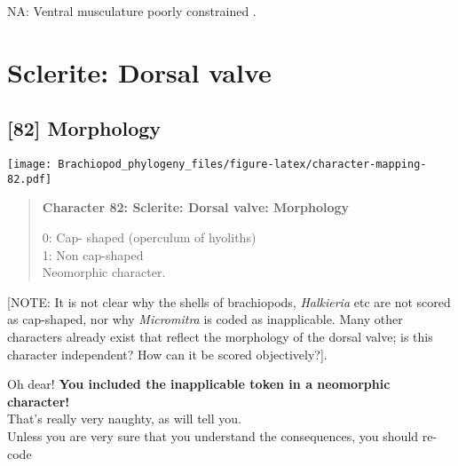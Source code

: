 \documentclass[openany]{book}
\theoremstyle{definition}
\theoremstyle{definition}
\theoremstyle{definition}
\theoremstyle{remark}
\begin{document}
\hypertarget{NA-coding-81}{}
NA: Ventral musculature poorly constrained
\citep{Williams2000LinguliformeaCraniiformea, Popov2009Earlyontogeny}.

\section{Sclerite: Dorsal valve}\label{sclerite-dorsal-valve}

\subsection*{{[}82{]} Morphology}\label{morphology-2}

\texttt{[image: Brachiopod\_phylogeny\_files/figure-latex/character-mapping-82.pdf]}

\begin{quote}
\textbf{Character 82: Sclerite: Dorsal valve: Morphology}

0: Cap- shaped (operculum of hyoliths)\\
1: Non cap-shaped\\
Neomorphic character.
\end{quote}

{[}NOTE: It is not clear why the shells of brachiopods, \emph{Halkieria}
etc are not scored as cap-shaped, nor why \emph{Micromitra} is coded as
inapplicable. Many other characters already exist that reflect the
morphology of the dorsal valve; is this character independent? How can
it be scored objectively?{]}.

Oh dear! \textbf{You included the inapplicable token in a neomorphic
character!}\\
That's really very naughty, as \citet{Brazeau2018} will tell you.\\
Unless you are very sure that you understand the consequences, you
should re-code
\end{document}
